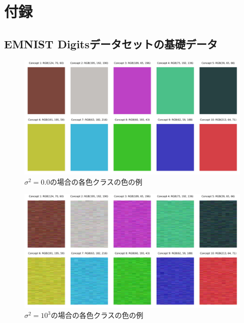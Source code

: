 \chapter{付録}
\label{付録}

\section{EMNIST Digitsデータセットの基礎データ}
\begin{figure}[H]
    \centering
    \includegraphics[width=\linewidth]{fig/color_varinace/0.pdf}
    \caption{$\sigma^2 = 0.0$の場合の各色クラスの色の例}
    \label{fig:variance_0}
\end{figure}

\begin{figure}[H]
    \centering
    \includegraphics[width=\linewidth]{fig/color_varinace/1000.pdf}
    \caption{$\sigma^2 = 10^3$の場合の各色クラスの色の例}
    \label{fig:variance_1000}
\end{figure}

